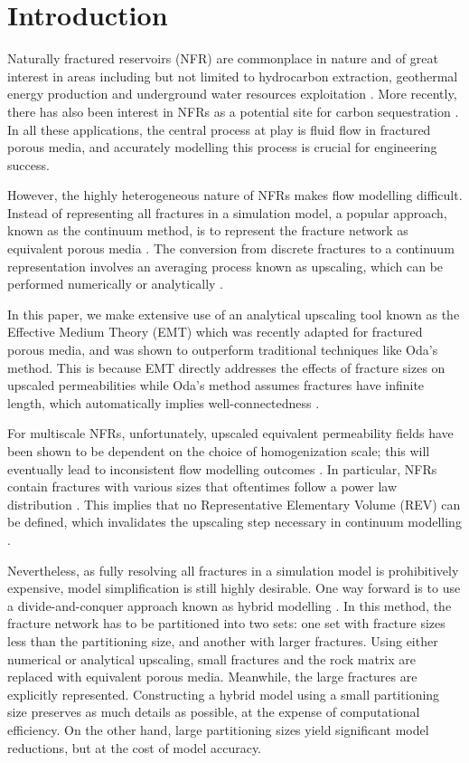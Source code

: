 \documentclass[draft]{agujournal2018}
\begin{document}
\section{Introduction}
Naturally fractured reservoirs (NFR) are commonplace in nature and of great interest in areas including but not limited to hydrocarbon extraction, geothermal energy production and underground water resources exploitation \citep{Berkowitz2002}. More recently, there has also been 
interest in NFRs as a potential site for carbon sequestration \citep{March2018}. In all these applications, the central process at play is fluid flow in fractured porous media, and accurately modelling this process is crucial for engineering success.

However, the highly heterogeneous nature of NFRs makes flow modelling difficult. Instead of representing all fractures in a simulation model, a popular approach, known as the continuum method, is to represent the fracture network as equivalent porous media \citep{Berre2018, Ezulike2013, Lemonnier2010a, Lemonnier2010, Warren1963, Yan2016}. The conversion from discrete fractures to a continuum representation involves an averaging process known as upscaling, which can be performed numerically or analytically \citep{Durlofsky1991,Oda1985,Renard1997,Saevik2013}. 

In this paper, we make extensive use of an analytical upscaling tool known as the Effective Medium Theory (EMT) which was recently adapted for fractured porous media, and was shown to outperform traditional techniques like Oda's method. This is because EMT directly addresses the effects of fracture sizes on upscaled permeabilities while Oda's method assumes fractures have infinite length, which automatically implies well-connectedness \citep{Oda1985, Saevik2013, Saevik2014}.

For multiscale NFRs, unfortunately, upscaled equivalent permeability fields have been shown to be dependent on the choice of homogenization scale; this will eventually lead to inconsistent flow modelling outcomes \citep{Elfeel2013}. In particular, NFRs contain fractures with various sizes that oftentimes follow a power law distribution \citep{Bonnet2001}. This implies that no Representative Elementary Volume (REV) can be defined, which invalidates the upscaling step necessary in continuum modelling \citep{Berkowitz2002}.

Nevertheless, as fully resolving all fractures in a simulation model is prohibitively expensive, model simplification is still highly desirable. One way forward is to use a divide-and-conquer approach known as hybrid modelling \citep{Berkowitz2002, Bourbiaux2010}. In this method, the fracture network has to be partitioned into two sets: one set with fracture sizes less than the partitioning size, and another with larger fractures. Using either numerical or analytical upscaling, small fractures and the rock matrix are replaced with equivalent porous media. Meanwhile, the large fractures are explicitly represented. Constructing a hybrid model using a small partitioning size preserves as much details as possible, at the expense of computational efficiency. On the other hand, large partitioning sizes yield significant model reductions, but at the cost of model accuracy.
\end{document}
